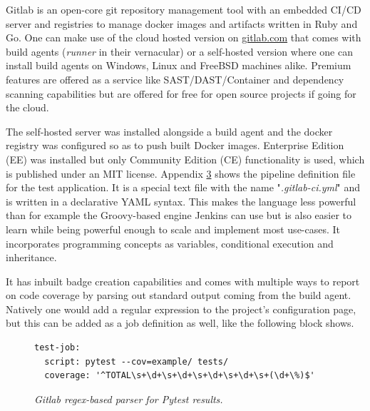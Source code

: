 Gitlab is an open-core git repository management tool with an embedded CI/CD server and registries to manage docker images and artifacts written in Ruby and Go. One can make use of the cloud hosted version on \url{gitlab.com} that comes with build agents (\textit{runner} in their vernacular) or a self-hosted version where one can install build agents on Windows, Linux and FreeBSD machines alike. Premium features are offered as a service like SAST/DAST/Container and dependency scanning capabilities but are offered for free for open source projects if going for the cloud.

The self-hosted server was installed alongside a build agent and the docker registry was configured so as to push built Docker images. Enterprise Edition (EE) was installed but only Community Edition (CE) functionality is used, which is published under an MIT license. Appendix \hyperref[chapter:appendix-gitlab]{3} shows the pipeline definition file for the test application. It is a special text file with the name "\textit{.gitlab-ci.yml}" and is written in a declarative YAML syntax. This makes the language less powerful than for example the Groovy-based engine Jenkins can use but is also easier to learn while being powerful enough to scale and implement most use-cases. It incorporates programming concepts as variables, conditional execution and inheritance.

\pagebreak

It has inbuilt badge creation capabilities and comes with multiple ways to report on code coverage by parsing out standard output coming from the build agent. Natively one would add a regular expression to the project's configuration page, but this can be added as a job definition as well, like the following block shows.
\begin{figure}[H]
\centering
\begin{lstlisting}[frame=single, basicstyle=\small, linewidth=\textwidth]
test-job:
  script: pytest --cov=example/ tests/
  coverage: '^TOTAL\s+\d+\s+\d+\s+\d+\s+\d+\s+(\d+\%)$'
\end{lstlisting}
\caption{\textit{Gitlab regex-based parser for Pytest results.}}
\label{fig:test-regex}
\end{figure}

